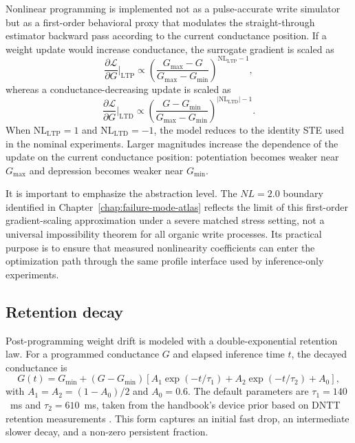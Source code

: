 Nonlinear programming is implemented not as a pulse-accurate write simulator but as a first-order behavioral proxy that modulates the straight-through estimator backward pass according to the current conductance position. If a weight update would increase conductance, the surrogate gradient is scaled as
\begin{equation}
\frac{\partial \mathcal{L}}{\partial G}\Big|_{\mathrm{LTP}} \propto \left(\frac{G_{\max}-G}{G_{\max}-G_{\min}}\right)^{\mathrm{NL}_{\mathrm{LTP}}-1},
\label{eq:nl-ltp}
\end{equation}
whereas a conductance-decreasing update is scaled as
\begin{equation}
\frac{\partial \mathcal{L}}{\partial G}\Big|_{\mathrm{LTD}} \propto \left(\frac{G-G_{\min}}{G_{\max}-G_{\min}}\right)^{|\mathrm{NL}_{\mathrm{LTD}}|-1}.
\label{eq:nl-ltd}
\end{equation}
When $\mathrm{NL}_{\mathrm{LTP}} = 1$ and $\mathrm{NL}_{\mathrm{LTD}} = -1$, the model reduces to the identity STE used in the nominal experiments. Larger magnitudes increase the dependence of the update on the current conductance position: potentiation becomes weaker near $G_{\max}$ and depression becomes weaker near $G_{\min}$.

It is important to emphasize the abstraction level. The $NL=2.0$ boundary identified in Chapter~\ref{chap:failure-mode-atlas} reflects the limit of this first-order gradient-scaling approximation under a severe matched stress setting, not a universal impossibility theorem for all organic write processes. Its practical purpose is to ensure that measured nonlinearity coefficients can enter the optimization path through the same profile interface used by inference-only experiments.

\subsection{Retention decay}
\label{subsec:retention-interface}

Post-programming weight drift is modeled with a double-exponential retention law. For a programmed conductance $G$ and elapsed inference time $t$, the decayed conductance is
\begin{equation}
G(t) = G_{\min} + \left(G - G_{\min}\right) \left[A_1 \exp\left(-t/\tau_1\right) + A_2 \exp\left(-t/\tau_2\right) + A_0\right],
\label{eq:retention}
\end{equation}
with $A_1 = A_2 = (1-A_0)/2$ and $A_0 = 0.6$. The default parameters are $\tau_1 = 140$~ms and $\tau_2 = 610$~ms, taken from the handbook's device prior based on DNTT retention measurements \citep{vincze2026dualplasticity}. This form captures an initial fast drop, an intermediate slower decay, and a non-zero persistent fraction.

